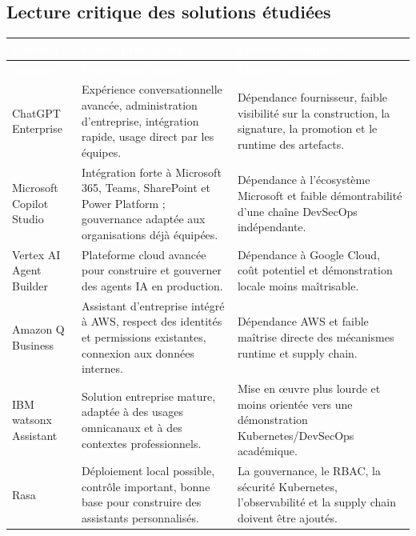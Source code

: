 \subsection{Lecture critique des solutions étudiées}

\begin{longtable}{|p{3.2cm}|p{5.4cm}|p{5.4cm}|}
\hline
\rowcolor{HeaderBlue}
\textcolor{white}{\textbf{Solution}} &
\textcolor{white}{\textbf{Forces principales}} &
\textcolor{white}{\textbf{Limites principales}} \\
\hline
\endfirsthead

\hline
\rowcolor{HeaderBlue}
\textcolor{white}{\textbf{Solution}} &
\textcolor{white}{\textbf{Forces principales}} &
\textcolor{white}{\textbf{Limites principales}} \\
\hline
\endhead

ChatGPT Enterprise &
Expérience conversationnelle avancée, administration d’entreprise, intégration rapide, usage direct par les équipes. &
Dépendance fournisseur, faible visibilité sur la construction, la signature, la promotion et le runtime des artefacts. \\
\hline

Microsoft Copilot Studio &
Intégration forte à Microsoft 365, Teams, SharePoint et Power Platform ; gouvernance adaptée aux organisations déjà équipées. &
Dépendance à l’écosystème Microsoft et faible démontrabilité d’une chaîne DevSecOps indépendante. \\
\hline

Vertex AI Agent Builder &
Plateforme cloud avancée pour construire et gouverner des agents IA en production. &
Dépendance à Google Cloud, coût potentiel et démonstration locale moins maîtrisable. \\
\hline

Amazon Q Business &
Assistant d’entreprise intégré à AWS, respect des identités et permissions existantes, connexion aux données internes. &
Dépendance AWS et faible maîtrise directe des mécanismes runtime et supply chain. \\
\hline

IBM watsonx Assistant &
Solution entreprise mature, adaptée à des usages omnicanaux et à des contextes professionnels. &
Mise en œuvre plus lourde et moins orientée vers une démonstration Kubernetes/DevSecOps académique. \\
\hline

Rasa &
Déploiement local possible, contrôle important, bonne base pour construire des assistants personnalisés. &
La gouvernance, le RBAC, la sécurité Kubernetes, l’observabilité et la supply chain doivent être ajoutés. \\
\hline


\end{longtable}
